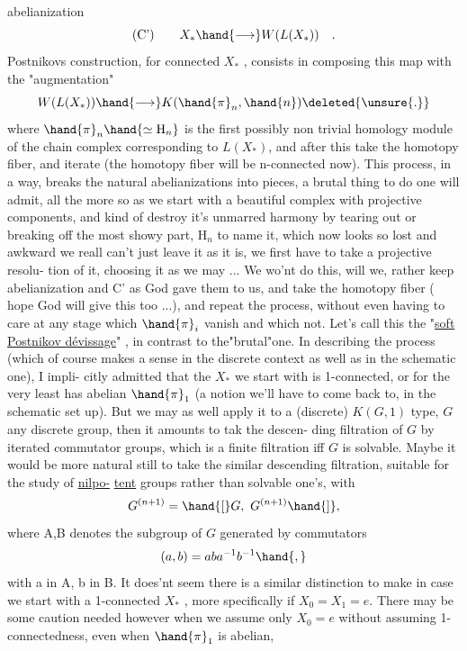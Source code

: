 
abelianization
\[ \text{(C')} \qquad X_{*} \hand{\longrightarrow} W(L(X_{*})) \quad . \]
Postnikovs construction, for connected $X_{*}$ , consists in composing
this map with the "augmentation"
\[ W(L(X_{*})) \hand{\longrightarrow} K(\hand{\pi}_n,\hand{n}) \deleted{\unsure{.}} \]
\hand{(}where $\hand{\pi}_n\hand{\simeq \mathrm{H}_n}$ is the first possibly non trivial homology module of the
chain complex corresponding to $L(X_{*})$\hand{)}, and after this  take the homotopy
fiber, and iterate (the homotopy fiber will be n-connected now). This
process, in a way, breaks the natural abelianizations  into
pieces, a  brutal thing to do one will admit, all the more so as
we start with a beautiful complex with projective components, and kind
of destroy it's unmarred harmony by tearing out or breaking off the most
showy part, $\mathrm{H}_n$ to name it, which now looks so lost and awkward we reall
can't just leave it as it is, we first have to take a projective resolu-%
tion of it, choosing it as we may ...  We wo'nt do  this, will we, 
rather keep abelianization and \hand{(}C'\hand{)} as God gave them to us, and take the
homotopy fiber ( hope God will give this too ...), and repeat the
process, without even having to care at any stage which $\hand{\pi}_i$ vanish and
which not. Let's call this the "\uline{soft Postnikov dévissage}" , in contrast
to the"brutal"one. In describing the process (which of course makes a
sense in the discrete context as well as in the schematic one), I impli-%
citly admitted that the $X_{*}$ we start with is 1-connected, or for the
very least has abelian $\hand{\pi}_1$ (a notion we'll have to come back to, in the
schematic  set up). But we may as well apply it to a (discrete)
$K(G,1)$ type, $G$ any discrete group, then it amounts to tak the descen-%
ding filtration of $G$ by iterated commutator groups, which is a finite
filtration iff $G$ is solvable. Maybe it would be more natural still to
take the similar descending filtration, suitable for the study of \uline{nilpo-}%
\uline{tent} groups rather than solvable one's, with
\[ G^{(n+1)} = \hand{[}G,\ G^{(n+1)}\hand{]}, \]
where \hand{$[$}A,B\hand{$]$} denotes the subgroup of $G$ generated by commutators 
\[ (a,b) = aba^{-1}b^{-1}\hand{,} \]
with a in A, b in B. It does'nt seem there is a similar distinction to
make in case we start with a  1-connected $X_{*}$ , more specifically
if $X_0=X_1= e$. There may be some  caution needed however when we assume
only $X_0= e$ without assuming 1-connectedness, even when $\hand{\pi}_1$ is abelian,


